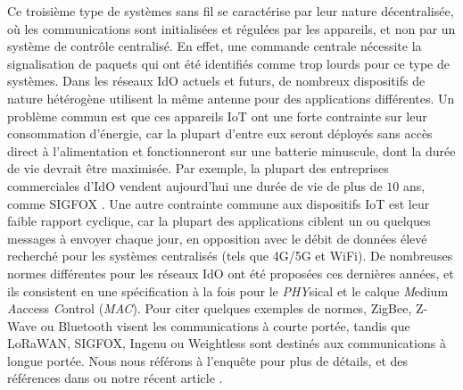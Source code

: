 \begin{resume_fr}
Ce troisième type de systèmes sans fil se caractérise par leur nature décentralisée,
où les communications sont initialisées et régulées par les appareils, et non par un système de contrôle centralisé.
%
En effet, une commande centrale nécessite la signalisation de paquets qui ont été identifiés comme trop lourds pour ce type de systèmes.
Dans les réseaux IdO actuels et futurs, de nombreux dispositifs de nature hétérogène utilisent la même antenne pour des applications différentes.
Un problème commun est que ces appareils IoT ont une forte contrainte sur leur consommation d'énergie, car la plupart d'entre eux seront déployés sans accès direct à l'alimentation et fonctionneront sur une batterie minuscule, dont la durée de vie devrait être maximisée.
Par exemple, la plupart des entreprises commerciales d'IdO vendent aujourd'hui une durée de vie de plus de $10$ ans, comme SIGFOX \cite{Centenaro16}.
Une autre contrainte commune aux dispositifs IoT est leur faible rapport cyclique, car la plupart des applications ciblent un ou quelques messages à envoyer chaque jour, en opposition avec le débit de données élevé recherché pour les systèmes centralisés (tels que 4G/5G et WiFi).
%
De nombreuses normes différentes pour les réseaux IdO ont été proposées ces dernières années,
et ils consistent en une spécification à la fois pour le \emph{PHY}sical
et le calque \emph{M}edium \emph{A}access \emph{C}ontrol (\emph{MAC}).
Pour citer quelques exemples de normes, ZigBee, Z-Wave ou Bluetooth visent les communications à courte portée, tandis que LoRaWAN, SIGFOX, Ingenu ou Weightless sont destinés aux communications à longue portée.
Nous nous référons à l'enquête \cite{Centenaro16} pour plus de détails, et des références dans \cite{Azari18} ou notre récent article \cite{MoyBesson2019}.



\end{resume_fr}
